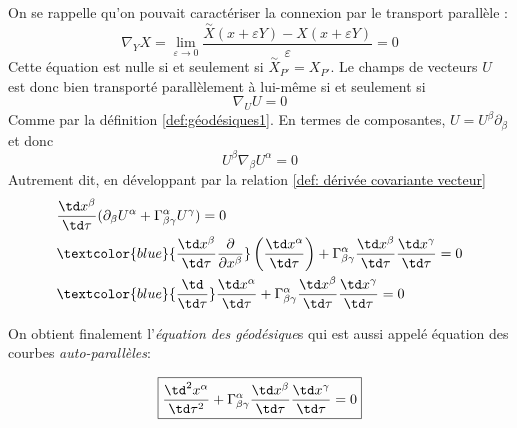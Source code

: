 On se rappelle qu'on pouvait caractériser la connexion par le transport parallèle :
\begin{equation}
    \nabla_{Y}X = \lim_{\varepsilon \rightarrow 0}\frac{\overset{\sim}{X}(x + \varepsilon Y) - X(x+\varepsilon Y)}{\varepsilon} = 0
\end{equation}
Cette équation est nulle si et seulement si $\overset{\sim}{X}_{P'} = X_{P'}$. Le champs de vecteurs $U$ est donc bien transporté parallèlement à lui-même si et seulement si 
\begin{equation}
    \nabla_{U}U =0 
\end{equation}
Comme par la définition \ref{def:géodésiques1}. En termes de composantes,  $U = U^{\beta}\partial_{\beta}$ et donc
\begin{equation}
U^{\beta}\nabla_{\beta}U^{\alpha} = 0
\end{equation}
Autrement dit, en développant par la relation \ref{def: dérivée covariante vecteur}
\begin{align}
    &\frac{\td x^{\beta}}{\td \tau} (\partial_{\beta}U^{\alpha} + \Gamma^{\alpha}_{\beta \gamma}U^{\gamma}) = 0\\
     &\textcolor{blue}{\frac{\td x^{\beta}}{\td \tau}\frac{\partial}{\partial x^{\beta}}}\left(\frac{\td x^{\alpha}}{\td \tau}\right) + \Gamma^{\alpha}_{\beta \gamma}\frac{\td x^{\beta}}{\td \tau}\frac{\td x^{\gamma}}{\td \tau} = 0\\
     & \textcolor{blue}{\frac{\td }{\td \tau}}\frac{\td x^{\alpha}}{\td \tau} + \Gamma^{\alpha}_{\beta \gamma} \frac{\td x^{\beta}}{\td \tau}\frac{\td x^{\gamma}}{\td \tau}= 0\\
\end{align}

On obtient finalement l'\emph{équation des géodésique}s qui est aussi appelé équation des courbes \emph{auto-parallèles}:


\begin{equation}
    \boxed{\frac{\td^2x^{\alpha}}{\td\tau^2} + \Gamma^{\alpha}_{\beta \gamma}\frac{\td x^{\beta}}{\td \tau}\frac{\td x^{\gamma}}{\td \tau} = 0}
    \label{eq:géodésique} 
\end{equation}

